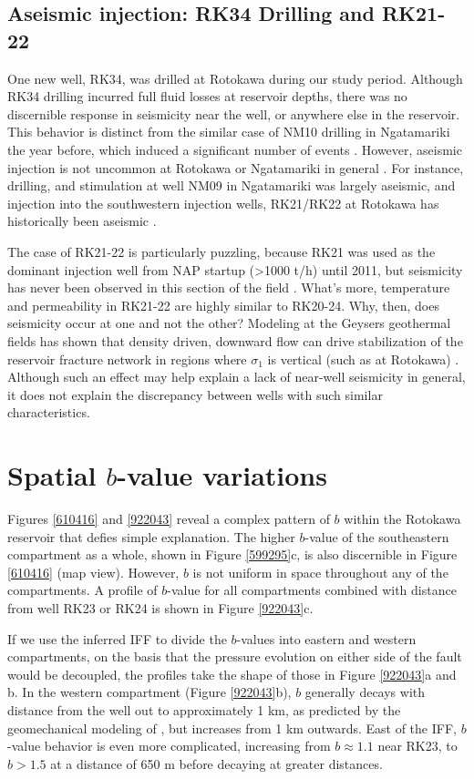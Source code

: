 \subsection{Aseismic injection: RK34 Drilling and RK21-22}
One new well, RK34, was drilled at Rotokawa during our study period. Although RK34 drilling incurred full fluid losses at reservoir depths, there was no discernible response in seismicity near the well, or anywhere else in the reservoir. This behavior is distinct from the similar case of NM10 drilling in Ngatamariki the year before, which induced a significant number of events \citep{j2019}. However, aseismic injection is not uncommon at Rotokawa or Ngatamariki in general \citep{Sewell_2015WGC}. For instance, drilling, and \gls{stimulation} at well NM09 in Ngatamariki was largely aseismic, and injection into the southwestern injection wells, RK21/RK22 at Rotokawa has historically been aseismic \citep{j2019,Sewell_2015WGC}.

The case of RK21-22 is particularly puzzling, because RK21 was used as the dominant injection well from NAP startup (\textgreater1000 t/h) until 2011, but seismicity has never been observed in this section of the field \citep{Sewell_2015WGC}. What's more, temperature and \gls{permeability} in RK21-22 are highly similar to RK20-24. Why, then, does seismicity occur at one and not the other? Modeling at the Geysers geothermal fields has shown that density driven, downward flow can drive stabilization of the reservoir fracture network in regions where $\sigma_{1}$ is vertical (such as at Rotokawa) \citep{Jeanne_2015tensor}. Although such an effect may help explain a lack of near-well seismicity in general, it does not explain the discrepancy between wells with such similar characteristics.

\section{Spatial $b$-value variations}\label{bvals}
Figures \ref{610416} and \ref{922043} reveal a complex pattern of $b$ within the Rotokawa reservoir that defies simple explanation. The higher $b$-value of the southeastern compartment as a whole, shown in Figure \ref{599295}c, is also discernible in Figure \ref{610416} (map view). However, $b$ is not uniform in space throughout any of the compartments. A profile of $b$-value for all compartments combined with distance from well RK23 or RK24 is shown in Figure \ref{922043}c.

If we use the inferred \acrshort{IFF} to divide the $b$-values into eastern and western compartments, on the basis that the pressure evolution on either side of the fault would be decoupled, the profiles take the shape of those in Figure \ref{922043}a and b. In the western compartment (Figure \ref{922043}b), $b$ generally decays with distance from the well out to approximately 1 km, as predicted by the geomechanical modeling of \citep{Bachmann_2012}, but increases from 1 km outwards. East of the \acrshort{IFF}, $b$-value behavior is even more complicated, increasing from $b\approx1.1$ near RK23, to $b>1.5$ at a distance of 650 m before decaying at greater distances.


